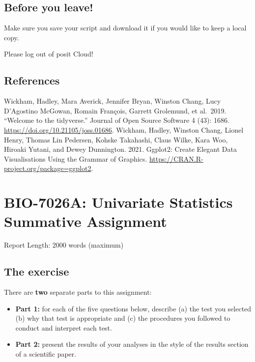 \documentclass[
]{book}
\providecommand{\tightlist}{%
  \setlength{\itemsep}{0pt}\setlength{\parskip}{0pt}}
\begin{document}
\hypertarget{before-you-leave-7}{%
\section{Before you leave!}\label{before-you-leave-7}}

Make sure you save your script and download it if you would like to keep a local copy.

Please log out of posit Cloud!

\hypertarget{references-6}{%
\section{References}\label{references-6}}

Wickham, Hadley, Mara Averick, Jennifer Bryan, Winston Chang, Lucy D'Agostino McGowan, Romain François, Garrett Grolemund, et al.~2019. ``Welcome to the tidyverse.'' Journal of Open Source Software 4 (43): 1686. \url{https://doi.org/10.21105/joss.01686}.
Wickham, Hadley, Winston Chang, Lionel Henry, Thomas Lin Pedersen, Kohske Takahashi, Claus Wilke, Kara Woo, Hiroaki Yutani, and Dewey Dunnington. 2021. Ggplot2: Create Elegant Data Visualisations Using the Grammar of Graphics. \url{https://CRAN.R-project.org/package=ggplot2}.

\hypertarget{bio-7026a-univariate-statistics-summative-assignment}{%
\chapter{BIO-7026A: Univariate Statistics Summative Assignment}\label{bio-7026a-univariate-statistics-summative-assignment}}

Report Length: 2000 words (maximum)

\hypertarget{the-exercise}{%
\section{The exercise}\label{the-exercise}}

There are \textbf{two} separate parts to this assignment:

\begin{itemize}
\tightlist
\item
  \textbf{Part 1:} for each of the five questions below, describe (a) the test you selected (b) why that test is appropriate and (c) the procedures you followed to conduct and interpret each test.
\item
  \textbf{Part 2:} present the results of your analyses in the style of the results section of a scientific paper.
\end{itemize}
\end{document}
